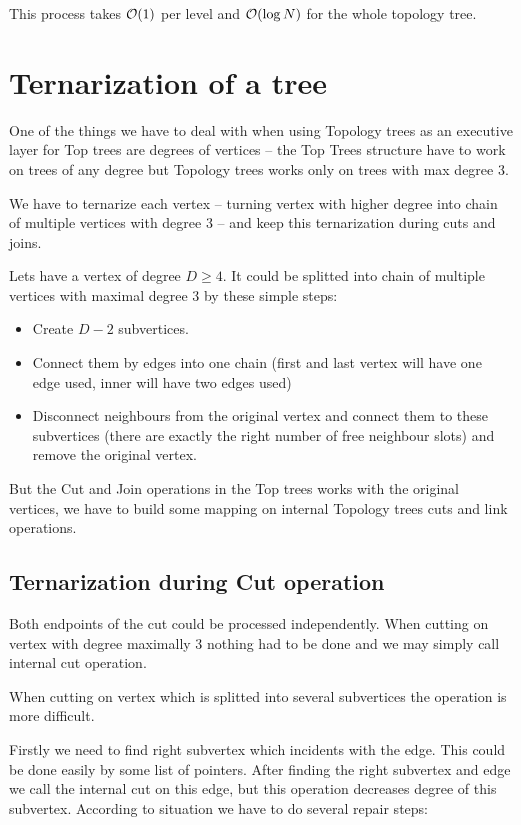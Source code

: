 This process takes ${\cal O}(1)$ per level and ${\cal O}(\log N)$ for the whole topology tree.

\section{Ternarization of a tree}

One of the things we have to deal with when using Topology trees as an executive
layer for Top trees are degrees of vertices -- the Top Trees structure have to
work on trees of any degree but Topology trees works only on trees with max
degree 3.

We have to {\I ternarize} each vertex -- turning vertex with higher degree into
chain of multiple vertices with degree 3 -- and keep this ternarization during
cuts and joins.

Lets have a vertex of degree $D\ge4$. It could be splitted into chain of
multiple vertices with maximal degree 3 by these simple steps:
\begin{itemize}
\item Create $D - 2$ subvertices.
\item Connect them by edges into one chain (first and last vertex will have one
edge used, inner will have two edges used)
\item Disconnect neighbours from the original vertex and connect them to these
subvertices (there are exactly the right number of free neighbour slots) and
remove the original vertex.
\end{itemize}

But the Cut and Join operations in the Top trees works with the original
vertices, we have to build some mapping on internal Topology trees cuts and link
operations.

\subsection{Ternarization during Cut operation}

Both endpoints of the cut could be processed independently. When cutting on
vertex with degree maximally 3 nothing had to be done and we may simply call
internal cut operation.

When cutting on vertex which is splitted into several subvertices the operation
is more difficult.

Firstly we need to find right subvertex which incidents with the edge. This
could be done easily by some list of pointers. After finding the right subvertex
and edge we call the internal cut on this edge, but this operation decreases
degree of this subvertex. According to situation we have to do several repair
steps:


